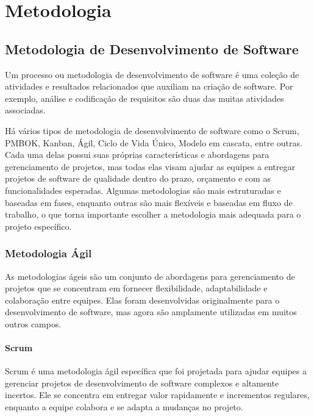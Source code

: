 \chapter[Metodologia]{Metodologia}

\section{Metodologia de Desenvolvimento de Software}

Um processo ou metodologia de desenvolvimento de software é uma coleção de atividades e resultados relacionados que auxiliam na criação de software. Por exemplo, análise e codificação de requisitos são duas das muitas atividades associadas. \cite{Soares2004}

Há vários tipos de metodologia de desenvolvimento de software como o Scrum, PMBOK, Kanban, Ágil, Ciclo de Vida Único, Modelo em cascata, entre outras. Cada uma delas possui suas próprias características e abordagens para gerenciamento de projetos, mas todas elas visam ajudar as equipes a entregar projetos de software de qualidade dentro do prazo, orçamento e com as funcionalidades esperadas. Algumas metodologias são mais estruturadas e baseadas em fases, enquanto outras são mais flexíveis e baseadas em fluxo de trabalho, o que torna importante escolher a metodologia mais adequada para o projeto específico. \cite{SilvaAnd2013}

\subsection{Metodologia Ágil}

As metodologias ágeis são um conjunto de abordagens para gerenciamento de projetos que se concentram em fornecer flexibilidade, adaptabilidade e colaboração entre equipes. Elas foram desenvolvidas originalmente para o desenvolvimento de software, mas agora são amplamente utilizadas em muitos outros campos. \cite{Libardi2010}

\subsubsection{Scrum}

Scrum é uma metodologia ágil específica que foi projetada para ajudar equipes a gerenciar projetos de desenvolvimento de software complexos e altamente incertos. Ele se concentra em entregar valor rapidamente e incrementos regulares, enquanto a equipe colabora e se adapta a mudanças no projeto. \cite{STOPA2019}

